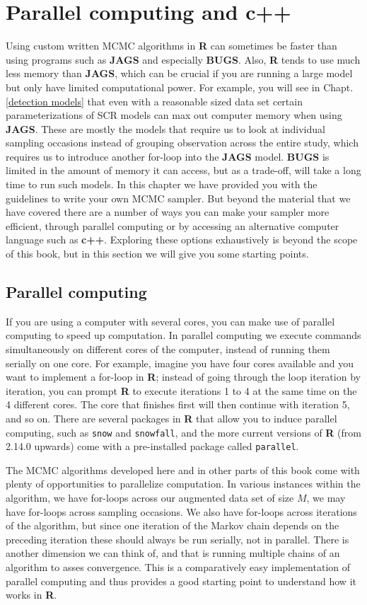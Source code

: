 \section{Parallel computing and {\bf c++}}
Using custom written MCMC algorithms in {\bf R} can sometimes be faster than using programs such as {\bf JAGS} and especially {\bf BUGS}. Also, {\bf R} tends to use much less memory than {\bf JAGS}, which can be crucial if you are running a large model but only have limited computational power. For example, you will see in Chapt. \ref{detection models} that even with a reasonable sized data set certain parameterizations of SCR models can max out computer memory when using {\bf JAGS}.  These are mostly the models that require us to look at individual sampling occasions instead of grouping observation across the entire study, which requires us to introduce another for-loop into the {\bf JAGS} model. {\bf BUGS} is limited in the amount of memory it can access, but as a trade-off, will take a long time to run such models. In this chapter we have provided you with the guidelines to write your own MCMC sampler. But beyond the material that we have covered there are a number of ways you can make your sampler more efficient, through parallel computing or by accessing an alternative computer language such as {\bf c++}. Exploring these options exhaustively is beyond the scope of this book, but in this section we will give you some starting points.

\subsection{Parallel computing}
If you are using a computer with several cores, you can make use of parallel computing to speed up computation. In parallel computing we execute commands simultaneously on different cores of the computer, instead of running them serially on one core. For example, imagine you have four cores available and you want to implement a for-loop in {\bf R}; instead of going through the loop iteration by iteration, you can prompt {\bf R} to execute iterations 1 to 4 at the same time on the 4 different cores. The core that finishes first will then continue with iteration 5, and so on.  There are several packages in {\bf R} that allow you to induce parallel computing, such as {\tt snow} and {\tt snowfall}, and the more current versions of {\bf R} (from 2.14.0 upwards) come with a pre-installed package called {\tt parallel}.  

The MCMC algorithms developed here and in other parts of this book come with plenty of opportunities to parallelize computation. In various instances within the algorithm, we have for-loops across our augmented data set of size $M$, we may have for-loops across sampling occasions. We also have for-loops across iterations of the algorithm, but since one iteration of the Markov chain depends on the preceding iteration these should always be run serially, not in parallel. There is another dimension we can think of, and that is running multiple chains of an algorithm to asses convergence. This is a comparatively easy implementation of parallel computing and thus provides a good starting point to understand how it works in {\bf R}.

